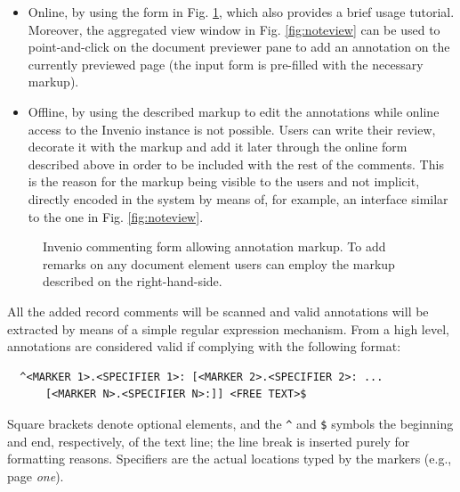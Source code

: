 \begin{itemize}
  \item Online, by using the form in Fig. \ref{fig:noteform}, which also
        provides a brief usage tutorial. Moreover, the aggregated view window in
        Fig. \ref{fig:noteview} can be used to point-and-click on the document
        previewer pane to add an annotation on the currently previewed page (the
        input form is pre-filled with the necessary markup).
  \item Offline, by using the described markup to edit the annotations while
        online access to the Invenio instance is not possible. Users can write
        their review, decorate it with the markup and add it later through the
        online form described above in order to be included with the rest of the
        comments. This is the reason for the markup being visible to the users
        and not implicit, directly encoded in the system by means of, for
        example, an interface similar to the one in Fig. \ref{fig:noteview}.
\end{itemize}

\begin{figure}[!h]
  \centering
  \caption[Invenio commenting form allowing annotation markup]
          {Invenio commenting form allowing annotation markup. To add remarks
           on any document element users can employ the markup described on the
           right-hand-side.}
  \label{fig:noteform}
\end{figure}

All the added record comments will be scanned and valid annotations will be
extracted by means of a simple regular expression mechanism. From a high level,
annotations are considered valid if complying with the following format:
\begin{verbatim}
  ^<MARKER 1>.<SPECIFIER 1>: [<MARKER 2>.<SPECIFIER 2>: ...
      [<MARKER N>.<SPECIFIER N>:]] <FREE TEXT>$
\end{verbatim}
Square brackets denote optional elements, and the \texttt{\^} and \texttt{\$}
symbols the beginning and end, respectively, of the text line; the line break
is inserted purely for formatting reasons. Specifiers are the actual locations
typed by the markers (e.g., page \textit{one}).


